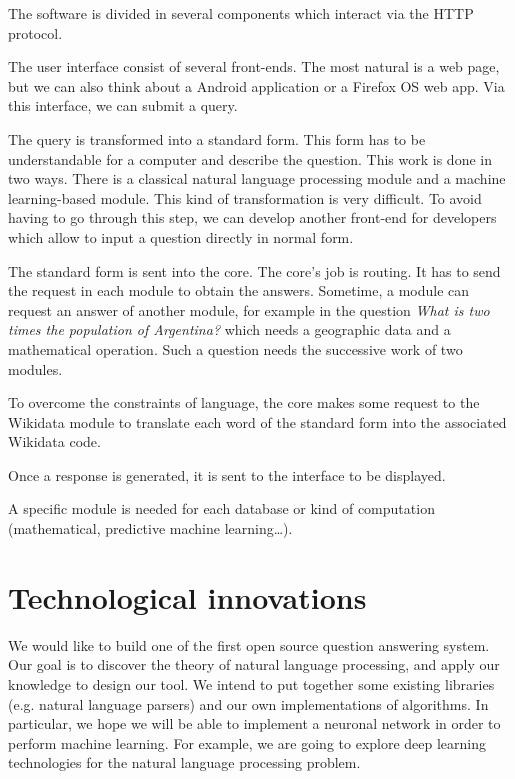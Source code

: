 \documentclass[a4paper,10pt]{article}
\begin{document}
The software is divided in several components which interact via the HTTP protocol.

The user interface consist of several front-ends. The most natural is
a web page, but we can also think about a Android application
or a Firefox OS web app. Via this interface, we can submit a query.

The query is transformed into a standard form. This form has to be understandable 
for a computer and describe the question. This work is done in two ways. There is 
a classical natural language processing module and a machine learning-based module. 
This kind of transformation is very difficult. To avoid having to go through this 
step, we can develop another front-end for developers which allow to input a question
 directly in normal form.

The standard form is sent into the core. The core's job is routing. It has to send 
the request in each module to obtain the answers. Sometime, a module can request 
an answer of another module, for example in the question \emph{What is two times the 
population of Argentina?} which needs a geographic data and a mathematical
 operation. Such a question needs the successive work of two modules.

To overcome the constraints of language, the core makes some request to the Wikidata
 module to translate each word of the standard form into the associated Wikidata 
 code.

Once a response is generated, it is sent to the interface to be displayed.

A specific module is needed for each database or kind of computation (mathematical, 
predictive machine learning\ldots).

\section{Technological innovations}

We would like to build one of the first open source question answering system. 
Our goal is to discover the theory of natural language processing, and apply our 
knowledge to design our tool. We intend to put together some existing libraries 
(e.g. natural language parsers) and our own implementations of algorithms. In 
particular, we hope we will be able to implement a neuronal network in order to 
perform machine learning. For example, we are going to explore deep learning
technologies for the natural language processing problem.
\end{document}
